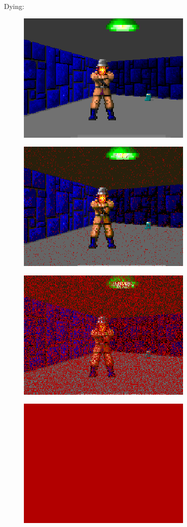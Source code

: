 Dying:\\
  \begin{figure}[H] \centering \includegraphics[scale=1.0]{imgs/fizzlefade/dying/screenshot_16.png} \end{figure}
    \begin{figure}[H] \centering \includegraphics[scale=1.0]{imgs/fizzlefade/dying/screenshot_19.png} \end{figure}
      \begin{figure}[H] \centering \includegraphics[scale=1.0]{imgs/fizzlefade/dying/screenshot_52.png} \end{figure}
        \begin{figure}[H] \centering \includegraphics[scale=1.0]{imgs/fizzlefade/dying/screenshot_86.png} \end{figure}

